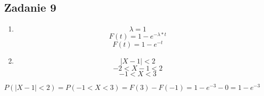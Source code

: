 \subsection{Zadanie 9}

\begin{enumerate}
\item
$$\lambda = 1$$
$$F(t) = 1 - e^{-\lambda *t}$$
$$F(t) = 1 - e^{-t}$$

\item
$$|X - 1| < 2$$
$$-2 < X - 1 < 2$$
$$-1 < X < 3$$
\end{enumerate}

$$P(|X-1| < 2) = P(-1 < X < 3) = F(3) - F(-1) = 1-e^{-3} - 0 = 1 - e^{-3}$$


